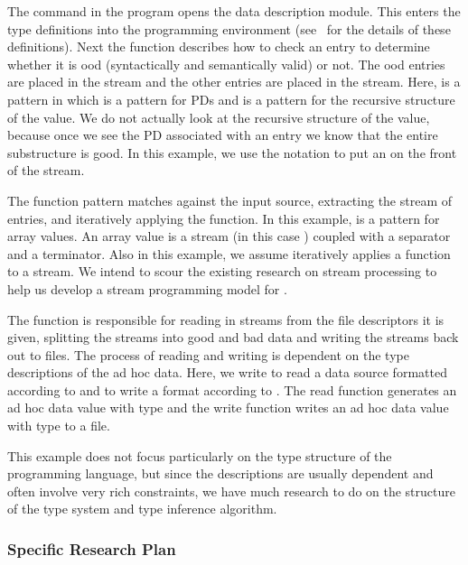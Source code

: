 \documentclass[11pt]{article}
\begin{document}
The command in the program opens the \dibbler{} data description module.
This enters the type definitions into the programming environment
(see~ for the details of these definitions).
Next the  function describes how to check an entry
to determine whether it is ood (syntactically and semantically
valid) or not.  The ood entries are placed in the 
stream and the other entries are placed in the  stream.
Here,  is a pattern in which  is
a pattern for PDs and  is a pattern for the recursive structure 
of the value.  We do not actually look at the recursive structure of the
value, because once we see the  PD associated with an entry
we know that the entire substructure is good.  
In this example, we use the notation  to put
an  on the front of the  stream. 

The  function pattern matches against the
input source, extracting the stream of entries, and iteratively
applying the  function.  In this example,
 is a pattern for array values.
An array value is a stream (in this case )
coupled with a separator and a terminator.  Also in this example,
we assume  
iteratively applies a function to a stream.  We intend to
scour the existing research on stream processing to help us
develop a stream programming model for \datatype. 

The function  is responsible for reading in
streams from the file descriptors it is given,
splitting the streams into good and bad data
and writing the streams back out to files.
The process of reading and writing is dependent on the
type descriptions of the ad hoc data.  Here, we write
 to read a data source formatted according to 
and  to write a format according to .
The read function generates an ad hoc data value with
type  and the write function writes an ad hoc data value with
type  to a file.

This example does not focus particularly on the type structure of the
programming language, but since the \datatype{} descriptions
are usually dependent and often involve very rich constraints,
we have much research to do on the structure of the \datatype{} type
system and type inference algorithm.

\subsubsection{Specific Research Plan}
\end{document}
